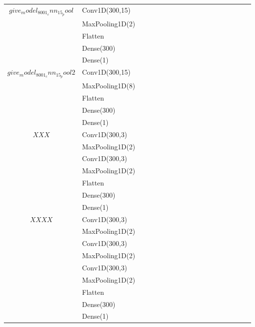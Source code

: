 \begin{longtable}{| c | m{0.58\linewidth} | r | m{0.1\linewidth} |}
    $give_model_8001_cnn_15_pool$  & Conv1D(300,15)                \\
                                   & MaxPooling1D(2)               \\
                                   & Flatten                       \\
                                   & Dense(300)                    \\
                                   & Dense(1)                      \\ \hline
    $give_model_8001_cnn_15_pool2$ & Conv1D(300,15)                \\
                                   & MaxPooling1D(8)               \\
                                   & Flatten                       \\
                                   & Dense(300)                    \\
                                   & Dense(1)                      \\ \hline
    $XXX$                          & Conv1D(300,3)                 \\
                                   & MaxPooling1D(2)               \\
                                   & Conv1D(300,3)                 \\
                                   & MaxPooling1D(2)               \\
                                   & Flatten                       \\
                                   & Dense(300)                    \\
                                   & Dense(1)                      \\ \hline

    $XXXX$                         & Conv1D(300,3)                 \\
                                   & MaxPooling1D(2)               \\
                                   & Conv1D(300,3)                 \\
                                   & MaxPooling1D(2)               \\
                                   & Conv1D(300,3)                 \\
                                   & MaxPooling1D(2)               \\
                                   & Flatten                       \\
                                   & Dense(300)                    \\
                                   & Dense(1)                      \\ \hline


\end{longtable}
